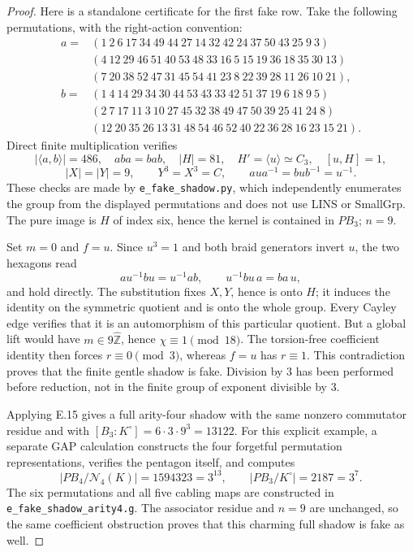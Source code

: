 \begin{proof}
Here is a standalone certificate for the first fake row.
Take the following permutations, with the right-action convention:
\begingroup\small
\begin{align*}
 a={}&(1\ 2\ 6\ 17\ 34\ 49\ 44\ 27\ 14\ 32\ 42\ 24\ 37\ 50\ 43\ 25\ 9\ 3)\\
 & (4\ 12\ 29\ 46\ 51\ 40\ 53\ 48\ 33\ 16\ 5\ 15\ 19\ 36\ 18\ 35\ 30\ 13)\\
 & (7\ 20\ 38\ 52\ 47\ 31\ 45\ 54\ 41\ 23\ 8\ 22\ 39\ 28\ 11\ 26\ 10\ 21),\\
 b={}&(1\ 4\ 14\ 29\ 34\ 30\ 44\ 53\ 43\ 33\ 42\ 51\ 37\ 19\ 6\ 18\ 9\ 5)\\
 & (2\ 7\ 17\ 11\ 3\ 10\ 27\ 45\ 32\ 38\ 49\ 47\ 50\ 39\ 25\ 41\ 24\ 8)\\
 & (12\ 20\ 35\ 26\ 13\ 31\ 48\ 54\ 46\ 52\ 40\ 22\ 36\ 28\ 16\ 23\ 15\ 21).
\end{align*}
\endgroup
Direct finite multiplication verifies
\[
 |\langle a,b\rangle|=486,\quad aba=bab,\quad
 |H|=81,\quad H'=\langle u\rangle\simeq C_3,
 \quad [u,H]=1,
\]
\[
 |X|=|Y|=9,\qquad Y^3=X^3=C,
 \qquad aua^{-1}=bub^{-1}=u^{-1}.
\]
These checks are made by \texttt{e\_fake\_shadow.py}, which
independently enumerates the group from the displayed
permutations and does not use LINS or SmallGrp. The pure image
is $H$ of index six, hence the kernel is contained in $PB_3$;
$n=9$.

Set $m=0$ and $f=u$. Since $u^3=1$ and both braid generators
invert $u$, the two hexagons read
\[
 a u^{-1}bu=u^{-1}ab,
 \qquad u^{-1}bu\,a=ba\,u,
\]
and hold directly. The substitution fixes $X,Y$, hence is onto
$H$; it induces the identity on the symmetric quotient and is
onto the whole group. Every Cayley edge verifies that it is
an automorphism of this particular quotient.
But a global lift would have $m\in9\widehat{\mathbb Z}$, hence
$\chi\equiv1\pmod {18}$. The torsion-free coefficient identity
then forces $r\equiv0\pmod3$, whereas $f=u$ has $r\equiv1$.
This contradiction proves that the finite gentle shadow is fake.
Division by $3$ has been performed before reduction, not in the
finite group of exponent divisible by $3$.

Applying E.15 gives a full arity-four shadow with the same
nonzero commutator residue and with
$[B_3:K^\circ]=6\cdot3\cdot9^3=13122$.
For this explicit example, a separate GAP calculation constructs
the four forgetful permutation representations, verifies the
pentagon itself, and computes
\[
 |PB_4/\mathcal N_4(K)|=1594323=3^{13},
 \qquad |PB_3/K^\circ|=2187=3^7.
\]
The six permutations and all five cabling maps are constructed
in \texttt{e\_fake\_shadow\_arity4.g}. The associator residue
and $n=9$ are unchanged, so the same coefficient obstruction
proves that this charming full shadow is fake as well.
\end{proof}

